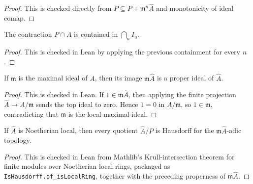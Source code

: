 \begin{proof}
  This is checked directly from \(P\subseteq P+\mathfrak m^n\widehat A\) and
  monotonicity of ideal comap.
\end{proof}

\begin{lemma}
  \label{lem:comap_le_bad_prime_contraction_chain_iinf}
  The contraction \(P\cap A\) is contained in \(\bigcap_n I_n\).
\end{lemma}

\begin{proof}
  This is checked in Lean by applying the previous containment for every
  \(n\).
\end{proof}

\begin{lemma}
  \label{lem:adic_completion_power_image_one_ne_top}
  If \(\mathfrak m\) is the maximal ideal of \(A\), then its image
  \(\mathfrak m\widehat A\) is a proper ideal of \(\widehat A\).
\end{lemma}

\begin{proof}
  This is checked in Lean.  If \(1\in\mathfrak m\widehat A\), then applying
  the finite projection
  \(\widehat A\to A/\mathfrak m\) sends the top ideal to zero.  Hence
  \(1=0\) in \(A/\mathfrak m\), so \(1\in\mathfrak m\), contradicting that
  \(\mathfrak m\) is the local maximal ideal.
\end{proof}

\begin{lemma}
  \label{lem:adic_completion_quotient_hausdorff_of_noetherian_local_completion}
  If \(\widehat A\) is Noetherian local, then every quotient
  \(\widehat A/P\) is Hausdorff for the \(\mathfrak m\widehat A\)-adic
  topology.
\end{lemma}

\begin{proof}
  This is checked in Lean from Mathlib's Krull-intersection theorem for finite
  modules over Noetherian local rings, packaged as
  \texttt{IsHausdorff.of\_isLocalRing}, together with the preceding properness
  of \(\mathfrak m\widehat A\).
\end{proof}

